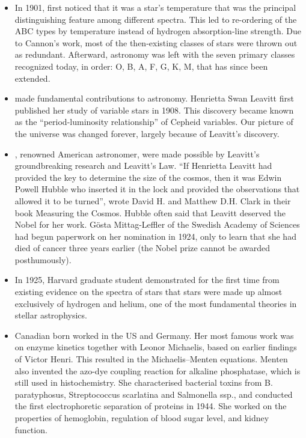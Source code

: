 \documentclass[12pt,a4paper]{article}
\begin{document}
\begin{enumerate}
\begin{itemize}
\begin{itemize}
        \item In 1901,  first noticed that it was a star's temperature that was the principal distinguishing feature among different spectra. This led to re-ordering of the ABC types by temperature instead of hydrogen absorption-line strength. Due to Cannon's work, most of the then-existing classes of stars were thrown out as redundant. Afterward, astronomy was left with the seven primary classes recognized today, in order: O, B, A, F, G, K, M, that has since been extended.
        \item {} made fundamental contributions to astronomy. Henrietta Swan Leavitt first published her study of variable stars in 1908. This discovery became known as the ``period-luminosity relationship'' of Cepheid variables. Our picture of the universe was changed forever, largely because of Leavitt's discovery.
        \item {}, renowned American astronomer, were made possible by Leavitt's groundbreaking research and Leavitt's Law. ``If Henrietta Leavitt had provided the key to determine the size of the cosmos, then it was Edwin Powell Hubble who inserted it in the lock and provided the observations that allowed it to be turned'', wrote David H. and Matthew D.H. Clark in their book Measuring the Cosmos. Hubble often said that Leavitt deserved the Nobel for her work. Gösta Mittag-Leffler of the Swedish Academy of Sciences had begun paperwork on her nomination in 1924, only to learn that she had died of cancer three years earlier (the Nobel prize cannot be awarded posthumously).
        \item In 1925, Harvard graduate student  demonstrated for the first time from existing evidence on the spectra of stars that stars were made up almost exclusively of hydrogen and helium, one of the most fundamental theories in stellar astrophysics.
        \item Canadian born  worked in the US and Germany. Her most famous work was on enzyme kinetics together with Leonor Michaelis, based on earlier findings of Victor Henri. This resulted in the Michaelis–Menten equations. Menten also invented the azo-dye coupling reaction for alkaline phosphatase, which is still used in histochemistry. She characterised bacterial toxins from B. paratyphosus, Streptococcus scarlatina and Salmonella ssp., and conducted the first electrophoretic separation of proteins in 1944. She worked on the properties of hemoglobin, regulation of blood sugar level, and kidney function.

\end{itemize}
\end{itemize}
\end{enumerate}
\end{document}
